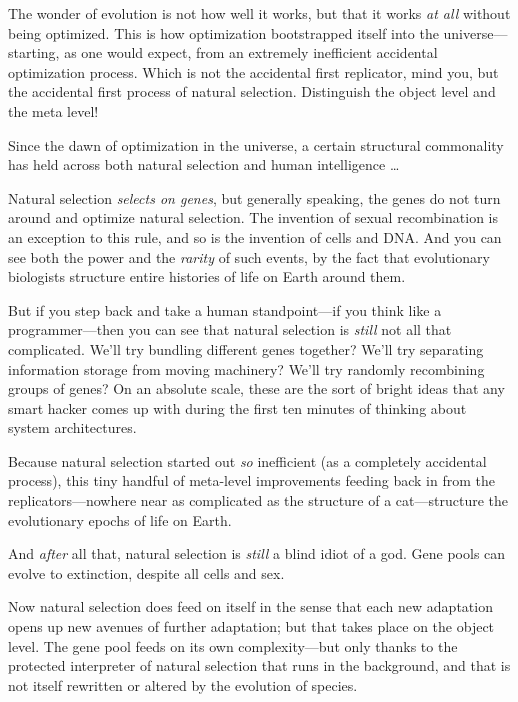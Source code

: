 {
 The wonder of evolution is not how well it works, but that it
works \textit{at all} without being optimized. This is how optimization
bootstrapped itself into the universe---starting, as one would expect,
from an extremely inefficient accidental optimization process. Which is
not the accidental first replicator, mind you, but the accidental first
process of natural selection. Distinguish the object level and the meta
level!}

{
 Since the dawn of optimization in the universe, a certain
structural commonality has held across both natural selection and human
intelligence \ldots}

{
 Natural selection \textit{selects on genes}, but generally
speaking, the genes do not turn around and optimize natural selection.
The invention of sexual recombination is an exception to this rule, and
so is the invention of cells and DNA. And you can see both the power
and the \textit{rarity} of such events, by the fact that evolutionary
biologists structure entire histories of life on Earth around them.}

{
 But if you step back and take a human standpoint---if you think
like a programmer---then you can see that natural selection is
\textit{still} not all that complicated. We'll try
bundling different genes together? We'll try separating
information storage from moving machinery? We'll try
randomly recombining groups of genes? On an absolute scale, these are
the sort of bright ideas that any smart hacker comes up with during the
first ten minutes of thinking about system architectures.}

{
 Because natural selection started out \textit{so} inefficient (as
a completely accidental process), this tiny handful of meta-level
improvements feeding back in from the replicators---nowhere near as
complicated as the structure of a cat---structure the evolutionary
epochs of life on Earth.}

{
 And \textit{after} all that, natural selection is \textit{still} a
blind idiot of a god. Gene pools can evolve to extinction, despite all
cells and sex.}

{
 Now natural selection does feed on itself in the sense that each
new adaptation opens up new avenues of further adaptation; but that
takes place on the object level. The gene pool feeds on its own
complexity---but only thanks to the protected interpreter of natural
selection that runs in the background, and that is not itself rewritten
or altered by the evolution of species.}

